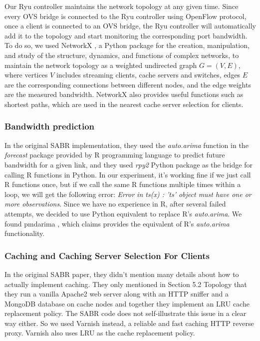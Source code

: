 \documentclass[12pt]{article}
\begin{document}
Our Ryu controller maintains the network topology at any given time. Since every OVS bridge is connected to the Ryu controller using OpenFlow protocol, once a client is connected to an OVS bridge, the Ryu controller will automatically add it to the topology and start monitoring the corresponding port bandwidth. To do so, we used NetworkX \cite{networkx}, a Python package for the creation, manipulation, and study of the structure, dynamics, and functions of complex networks, to maintain the network topology as a weighted undirected graph $G=(V, E)$, where vertices $V$ includes streaming clients, cache servers and switches, edges $E$ are the corresponding connections between different nodes, and the edge weights are the measured bandwidth. NetworkX also provides useful functions such as shortest paths, which are used in the nearest cache server selection for clients. 

\subsubsection{Bandwidth prediction}
In the original SABR implementation, they used the \textit{auto.arima} function in the \textit{forecast} package provided by R programming language to predict future bandwidth for a given link, and they used \textit{rpy2} Python package as the bridge for calling R functions in Python. In our experiment, it's working fine if we just call R functions once, but if we call the same R functions multiple times within a loop, we will get the following error: \textit{Error in ts(x) : 'ts' object must have one or more observations}. Since we have no experience in R, after several failed attempts, we decided to use Python equivalent to replace R's \textit{auto.arima}. We found pmdarima \cite{pmdarima}, which claims provides the equivalent of R's \textit{auto.arima} functionality. 

\subsubsection{Caching and Caching Server Selection For Clients}
In the original SABR paper, they didn't mention many details about how to actually implement caching. They only mentioned in Section 5.2 Topology that they run a vanilla Apache2 web server along with an HTTP sniffer and a MongoDB database on cache nodes and together they implement an LRU cache replacement policy. The SABR code does not self-illustrate this issue in a clear way either. So we used Varnish \cite{varnish} instead, a reliable and fast caching HTTP reverse proxy. Varnish also uses LRU as the cache replacement policy. 
\end{document}

